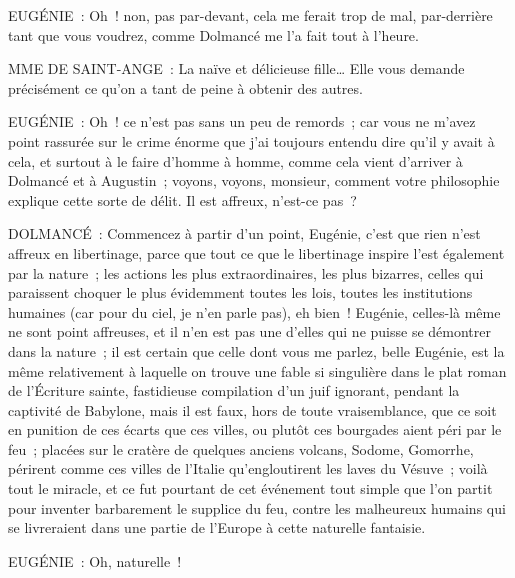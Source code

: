 \documentclass[french,twoside]{book} %
\begin{document}
EUGÉNIE : Oh ! non, pas par-devant, cela me ferait trop de mal, par-derrière tant que vous voudrez, comme Dolmancé me l’a fait tout à l’heure.\par
MME DE SAINT-ANGE : La naïve et délicieuse fille… Elle vous demande précisément ce qu’on a tant de peine à obtenir des autres.\par
EUGÉNIE : Oh ! ce n’est pas sans un peu de remords ; car vous ne m’avez point rassurée sur le crime énorme que j’ai toujours entendu dire qu’il y avait à cela, et surtout à le faire d’homme à homme, comme cela vient d’arriver à Dolmancé et à Augustin ; voyons, voyons, monsieur, comment votre philosophie explique cette sorte de délit. Il est affreux, n’est-ce pas ?\par
DOLMANCÉ : Commencez à partir d’un point, Eugénie, c’est que rien n’est affreux en libertinage, parce que tout ce que le libertinage inspire l’est également par la nature ; les actions les plus extraordinaires, les plus bizarres, celles qui paraissent choquer le plus évidemment toutes les lois, toutes les institutions humaines (car pour du ciel, je n’en parle pas), eh bien ! Eugénie, celles-là même ne sont point affreuses, et il n’en est pas une d’elles qui ne puisse se démontrer dans la nature ; il est certain que celle dont vous me parlez, belle Eugénie, est la même relativement à laquelle on trouve une fable si singulière dans le plat roman de l’Écriture sainte, fastidieuse compilation d’un juif ignorant, pendant la captivité de Babylone, mais il est faux, hors de toute vraisemblance, que ce soit en punition de ces écarts que ces villes, ou plutôt ces bourgades aient péri par le feu ; placées sur le cratère de quelques anciens volcans, Sodome, Gomorrhe, périrent comme ces villes de l’Italie qu’engloutirent les laves du Vésuve ; voilà tout le miracle, et ce fut pourtant de cet événement tout simple que l’on partit pour inventer barbarement le supplice du feu, contre les malheureux humains qui se livreraient dans une partie de l’Europe à cette naturelle fantaisie.\par
EUGÉNIE : Oh, naturelle !\par
\end{document}
